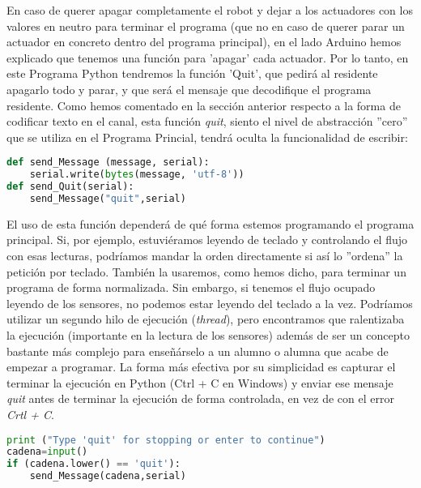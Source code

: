 \par En caso de querer apagar completamente el robot y dejar a los actuadores con los valores en neutro para terminar el programa (que no en caso de querer parar un actuador en concreto dentro del programa principal), en el lado Arduino hemos explicado que tenemos una función para 'apagar' cada actuador. Por lo tanto, en este Programa Python tendremos la función 'Quit', que pedirá al residente apagarlo todo y parar, y que será el mensaje que decodifique el programa residente. Como hemos comentado en la sección anterior respecto a la forma de codificar texto en el canal, esta función \textit{quit}, siento el nivel de abstracción ''cero'' que se utiliza en el Programa Princial, tendrá oculta la funcionalidad de escribir:

\begin{lstlisting}[language=python,caption={Mensaje \textit{terminate} para los actuadores},captionpos=b]
def send_Message (message, serial):
	serial.write(bytes(message, 'utf-8'))
def send_Quit(serial):
	send_Message("quit",serial)
\end{lstlisting}

El uso de esta función dependerá de qué forma estemos programando el programa principal. Si, por ejemplo, estuviéramos leyendo de teclado y controlando el flujo con esas lecturas, podríamos mandar la orden directamente si así lo ''ordena'' la petición por teclado. También la usaremos, como hemos dicho, para terminar un programa de forma normalizada. Sin embargo, si tenemos el flujo ocupado leyendo de los sensores, no podemos estar leyendo del teclado a la vez. Podríamos utilizar un segundo hilo de ejecución (\textit{thread}), pero encontramos que ralentizaba la ejecución (importante en la lectura de los sensores) además de ser un concepto bastante más complejo para enseñárselo a un alumno o alumna que acabe de empezar a programar. La forma más efectiva por su simplicidad es capturar el terminar la ejecución en Python (Ctrl + C en Windows) y enviar ese mensaje \textit{quit} antes de terminar la ejecución de forma controlada, en vez de con el error \textit{Crtl + C}. \\

\begin{lstlisting}[language=python,caption={Ejemplo de finalización de programa con control de flujo},captionpos=b]
print ("Type 'quit' for stopping or enter to continue")
cadena=input()
if (cadena.lower() == 'quit'):
	send_Message(cadena,serial)
	
\end{lstlisting}


